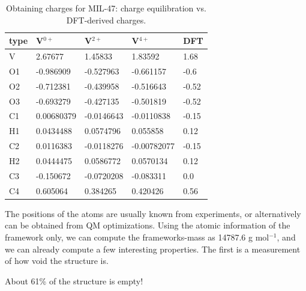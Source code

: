 \begin{table}[t]
\begin{tabularx}{\linewidth}{X|X|X|X|X}
type &   V$^{0+}$    &  V$^{2+}$    & V$^{4+}$     & DFT \\
\hline
V    &   2.67677     &  1.45833     &  1.83592     &  1.68 \\
O1   &  -0.986909    & -0.527963    & -0.661157    & -0.6  \\
O2   &  -0.712381    & -0.439958    & -0.516643    & -0.52 \\
O3   &  -0.693279    & -0.427135    & -0.501819    & -0.52 \\
C1   &   0.00680379  & -0.0146643   & -0.0110838   & -0.15 \\
H1   &   0.0434488   &  0.0574796   &  0.055858    &  0.12 \\
C2   &   0.0116383   & -0.0118276   & -0.00782077  & -0.15 \\
H2   &   0.0444475   &  0.0586772   &  0.0570134   &  0.12 \\
C3   &  -0.150672    & -0.0720208   & -0.083311    &  0.0 \\
C4   &   0.605064    &  0.384265    &  0.420426    &  0.56 \\
\end{tabularx}
\caption{Obtaining charges for MIL-47: charge equilibration vs. DFT-derived charges.}
\label{Tutorial-charges}
\end{table}

The positions of the atoms are usually known from experiments, or alternatively can be obtained from QM optimizations.
Using the atomic information of the framework only, we can compute the frameworks-mass as 14787.6 g mol$^{-1}$, 
and we can already compute a few interesting properties. 
The first is a measurement of how void the structure is.

\begin{center}
\end{center}

About 61\% of the structure is empty!

\begin{center}
\end{center}

